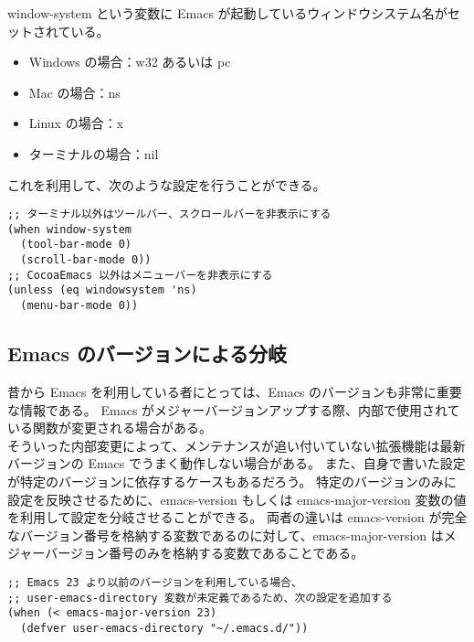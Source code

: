 window-system という変数に Emacs が起動しているウィンドウシステム名がセットされている。
\begin{itemize}\setlength{\leftskip}{-0.40zw}%
\item Windows の場合：w32 あるいは pc
\item Mac の場合：ns
\item Linux の場合：x
\item ターミナルの場合：nil
\end{itemize}
これを利用して、次のような設定を行うことができる。
\begin{mdframed}[roundcorner=0.50zw,leftmargin=3.00zw,rightmargin=3.00zw,skipabove=0.40zw,skipbelow=0.40zw,innertopmargin=4.00pt,innerbottommargin=4.00pt,innerleftmargin=5.00pt,innerrightmargin=5.00pt,linecolor=gray!020,linewidth=0.50pt,backgroundcolor=gray!20]
\begin{verbatim}
;; ターミナル以外はツールバー、スクロールバーを非表示にする
(when window-system
  (tool-bar-mode 0)
  (scroll-bar-mode 0))
;; CocoaEmacs 以外はメニューバーを非表示にする
(unless (eq windowsystem 'ns)
  (menu-bar-mode 0))
\end{verbatim}
\end{mdframed}
\subsection{Emacs のバージョンによる分岐}
昔から Emacs を利用している者にとっては、Emacs のバージョンも非常に重要な情報である。
Emacs がメジャーバージョンアップする際、内部で使用されている関数が変更される場合がある。\\

そういった内部変更によって、メンテナンスが追い付いていない拡張機能は最新バージョンの Emacs でうまく動作しない場合がある。
また、自身で書いた設定が特定のバージョンに依存するケースもあるだろう。
特定のバージョンのみに設定を反映させるために、emacs-version もしくは emacs-major-version 変数の値を利用して設定を分岐させることができる。
両者の違いは emacs-version が完全なバージョン番号を格納する変数であるのに対して、emacs-major-version はメジャーバージョン番号のみを格納する変数であることである。
\begin{mdframed}[roundcorner=0.50zw,leftmargin=3.00zw,rightmargin=3.00zw,skipabove=0.40zw,skipbelow=0.40zw,innertopmargin=4.00pt,innerbottommargin=4.00pt,innerleftmargin=5.00pt,innerrightmargin=5.00pt,linecolor=gray!020,linewidth=0.50pt,backgroundcolor=gray!20]
\begin{verbatim}
;; Emacs 23 より以前のバージョンを利用している場合、
;; user-emacs-directory 変数が未定義であるため、次の設定を追加する
(when (< emacs-major-version 23)
  (defver user-emacs-directory "~/.emacs.d/"))
\end{verbatim}
\end{mdframed}
